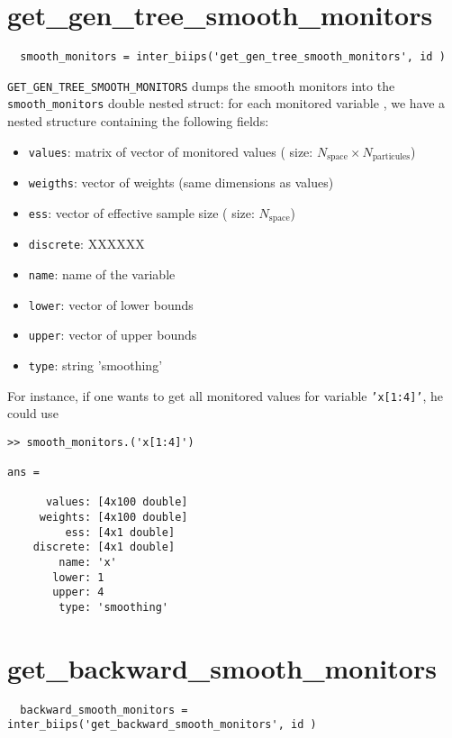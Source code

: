 \documentclass[11pt]{article}
\begin{document}
 \section{get\_gen\_tree\_smooth\_monitors}
 
 \begin{lstlisting}
  smooth_monitors = inter_biips('get_gen_tree_smooth_monitors', id )
 \end{lstlisting}
 
 \texttt{GET\_GEN\_TREE\_SMOOTH\_MONITORS} dumps the smooth monitors into the \texttt{smooth\_monitors} double nested struct: for each monitored variable , we have
  a nested structure containing the following fields:

  \begin{itemize}
   \item \texttt{values}: matrix of vector of monitored values ( size: $N_{\mbox{space}} \times N_{\mbox{particules}}$)
   \item \texttt{weigths}: vector of weights (same dimensions as values)
   \item \texttt{ess}: vector of effective  sample size ( size: $N_{\mbox{space}}$)
   \item \texttt{discrete}: XXXXXX
   \item \texttt{name}: name of the variable
   \item \texttt{lower}: vector of lower bounds
   \item \texttt{upper}: vector of upper bounds
   \item \texttt{type}: string 'smoothing' 
   \end{itemize}

  For instance, if one wants to get all monitored values for variable \texttt{'x[1:4]'}, he could use
 \begin{lstlisting}
>> smooth_monitors.('x[1:4]')

ans = 

      values: [4x100 double]
     weights: [4x100 double]
         ess: [4x1 double]
    discrete: [4x1 double]
        name: 'x'
       lower: 1
       upper: 4
        type: 'smoothing'
 \end{lstlisting}

 \section{get\_backward\_smooth\_monitors}
 
 \begin{lstlisting}
  backward_smooth_monitors = inter_biips('get_backward_smooth_monitors', id )
 \end{lstlisting}
 
\end{document}
